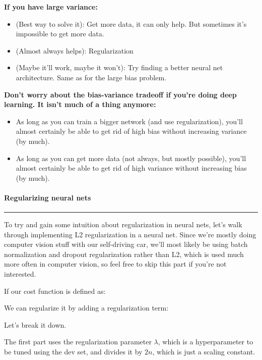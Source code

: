 \documentclass[
]{article}
\begin{document}
\textbf{If you have large variance:}

\begin{itemize}
\item
  (Best way to solve it): Get more data, it can only help. But sometimes
  it's impossible to get more data.
\item
  (Almost always helps): Regularization
\item
  (Maybe it'll work, maybe it won't): Try finding a better neural net
  architecture. Same as for the large bias problem.
\end{itemize}

\textbf{Don't worry about the bias-variance tradeoff if you're doing
deep learning. It isn't much of a thing anymore:}

\begin{itemize}
\item
  As long as you can train a bigger network (and use regularization),
  you'll almost certainly be able to get rid of high bias without
  increasing variance (by much).
\item
  As long as you can get more data (not always, but mostly possible),
  you'll almost certainly be able to get rid of high variance without
  increasing bias (by much).
\end{itemize}

\hypertarget{header-n84}{%
\paragraph{\texorpdfstring{\textbf{Regularizing neural
nets}}{Regularizing neural nets}}\label{header-n84}}

\begin{center}\rule{0.5\linewidth}{0.5pt}\end{center}

To try and gain some intuition about regularization in neural nets,
let's walk through implementing L2 regularization in a neural net. Since
we're mostly doing computer vision stuff with our self-driving car,
we'll most likely be using batch normalization and dropout
regularization rather than L2, which is used much more often in computer
vision, so feel free to skip this part if you're not interested.

If our cost function is defined as:

We can regularize it by adding a regularization term:

Let's break it down.

The first part uses the regularization parameter \(\lambda\), which is a
hyperparameter to be tuned using the dev set, and divides it by \(2n\),
which is just a scaling constant.
\end{document}
